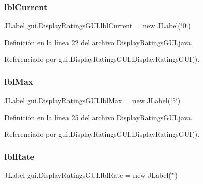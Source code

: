 \subsubsection{\texorpdfstring{lblCurrent}{lblCurrent}}
{\footnotesize\ttfamily J\+Label gui.\+Display\+Ratings\+G\+U\+I.\+lbl\+Current = new J\+Label(\char`\"{}0\char`\"{})\hspace{0.3cm}{\ttfamily [private]}}



Definición en la línea 22 del archivo Display\+Ratings\+G\+U\+I.\+java.



Referenciado por gui.\+Display\+Ratings\+G\+U\+I.\+Display\+Ratings\+G\+U\+I().

\mbox{\label{classgui_1_1_display_ratings_g_u_i_a46c665c4d59be0fc85e5600d949c0c38}} 
\subsubsection{\texorpdfstring{lblMax}{lblMax}}
{\footnotesize\ttfamily J\+Label gui.\+Display\+Ratings\+G\+U\+I.\+lbl\+Max = new J\+Label(\char`\"{}5\char`\"{})\hspace{0.3cm}{\ttfamily [private]}}



Definición en la línea 25 del archivo Display\+Ratings\+G\+U\+I.\+java.



Referenciado por gui.\+Display\+Ratings\+G\+U\+I.\+Display\+Ratings\+G\+U\+I().

\mbox{\label{classgui_1_1_display_ratings_g_u_i_aa8eadb796ab524b992c52893d5aeaf15}} 
\subsubsection{\texorpdfstring{lblRate}{lblRate}}
{\footnotesize\ttfamily J\+Label gui.\+Display\+Ratings\+G\+U\+I.\+lbl\+Rate = new J\+Label(\char`\"{}\char`\"{})\hspace{0.3cm}{\ttfamily [private]}}



